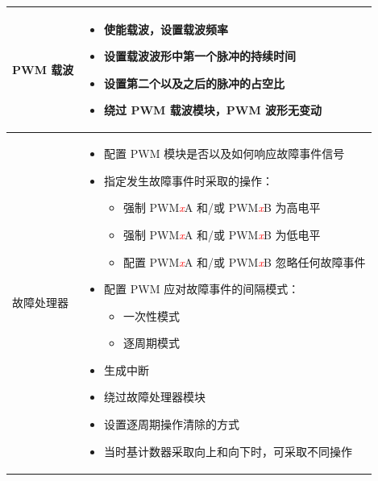 \begin{longtable}[c]{|p{4cm}|p{11cm}|}
    \multirow{5}{*}{PWM 载波} &
    \vspace{-1em}\begin{itemize}
        \item 使能载波，设置载波频率
        \item 设置载波波形中第一个脉冲的持续时间
        \item 设置第二个以及之后的脉冲的占空比
        \item 绕过 PWM 载波模块，PWM 波形无变动
    \vspace{-1em}\end{itemize}\\\hline
    
    \multirow{13}{*}{故障处理器} &
    \vspace{-1em}\begin{itemize}    
        \item 配置 PWM 模块是否以及如何响应故障事件信号
        \item 指定发生故障事件时采取的操作：
        \begin{itemize}
            \item 强制 PWM\textcolor{red}{\it{x}}A 和/或 PWM\textcolor{red}{\it{x}}B 为高电平
            \item 强制 PWM\textcolor{red}{\it{x}}A 和/或 PWM\textcolor{red}{\it{x}}B 为低电平
            \item 配置 PWM\textcolor{red}{\it{x}}A 和/或 PWM\textcolor{red}{\it{x}}B 忽略任何故障事件
        \end{itemize}
        \item 配置 PWM 应对故障事件的间隔模式：
        \begin{itemize}
            \item 一次性模式
            \item 逐周期模式
        \end{itemize}
        \item 生成中断
        \item 绕过故障处理器模块
        \item 设置逐周期操作清除的方式
        \item 当时基计数器采取向上和向下时，可采取不同操作
\vspace{-1em}
    \end{itemize}\\\hline
    
\end{longtable}
